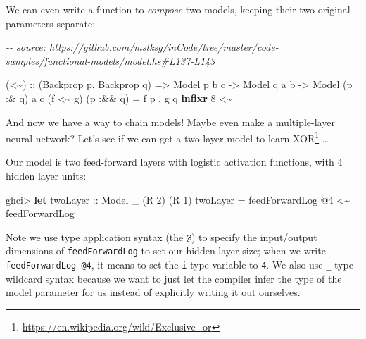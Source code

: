 \documentclass[]{article}
\newenvironment{Shaded}{}{}
\newcommand{\CommentTok}[1]{\textcolor[rgb]{0.38,0.63,0.69}{\textit{#1}}}
\newcommand{\DataTypeTok}[1]{\textcolor[rgb]{0.56,0.13,0.00}{#1}}
\newcommand{\DecValTok}[1]{\textcolor[rgb]{0.25,0.63,0.44}{#1}}
\newcommand{\KeywordTok}[1]{\textcolor[rgb]{0.00,0.44,0.13}{\textbf{#1}}}
\newcommand{\NormalTok}[1]{#1}
\newcommand{\OperatorTok}[1]{\textcolor[rgb]{0.40,0.40,0.40}{#1}}
\newcommand{\OtherTok}[1]{\textcolor[rgb]{0.00,0.44,0.13}{#1}}
\renewcommand{\href}[2]{#2\footnote{\url{#1}}}
\begin{document}
We can even write a function to \emph{compose} two models, keeping their two
original parameters separate:

\begin{Shaded}
\begin{Highlighting}[]
\CommentTok{{-}{-} source: https://github.com/mstksg/inCode/tree/master/code{-}samples/functional{-}models/model.hs\#L137{-}L143}

\NormalTok{(}\OperatorTok{\textless{}\textasciitilde{}}\NormalTok{)}
\OtherTok{    ::}\NormalTok{ (}\DataTypeTok{Backprop}\NormalTok{ p, }\DataTypeTok{Backprop}\NormalTok{ q)}
    \OtherTok{=\textgreater{}} \DataTypeTok{Model}\NormalTok{  p       b c}
    \OtherTok{{-}\textgreater{}} \DataTypeTok{Model}\NormalTok{       q  a b}
    \OtherTok{{-}\textgreater{}} \DataTypeTok{Model}\NormalTok{ (p }\OperatorTok{:\&}\NormalTok{ q) a c}
\NormalTok{(f }\OperatorTok{\textless{}\textasciitilde{}}\NormalTok{ g) (p }\OperatorTok{:\&\&}\NormalTok{ q) }\OtherTok{=}\NormalTok{ f p }\OperatorTok{.}\NormalTok{ g q}
\KeywordTok{infixr} \DecValTok{8} \OperatorTok{\textless{}\textasciitilde{}}
\end{Highlighting}
\end{Shaded}

And now we have a way to chain models! Maybe even make a multiple-layer neural
network? Let's see if we can get a two-layer model to learn
\href{https://en.wikipedia.org/wiki/Exclusive_or}{XOR} \ldots{}

Our model is two feed-forward layers with logistic activation functions, with 4
hidden layer units:

\begin{Shaded}
\begin{Highlighting}[]
\NormalTok{ghci}\OperatorTok{\textgreater{}} \KeywordTok{let}\OtherTok{ twoLayer ::} \DataTypeTok{Model}\NormalTok{ \_ (}\DataTypeTok{R} \DecValTok{2}\NormalTok{) (}\DataTypeTok{R} \DecValTok{1}\NormalTok{)}
\NormalTok{          twoLayer }\OtherTok{=}\NormalTok{ feedForwardLog\textquotesingle{} }\OperatorTok{@}\DecValTok{4} \OperatorTok{\textless{}\textasciitilde{}}\NormalTok{ feedForwardLog\textquotesingle{}}
\end{Highlighting}
\end{Shaded}

Note we use type application syntax (the \texttt{@}) to specify the input/output
dimensions of \texttt{feedForwardLog\textquotesingle{}} to set our hidden layer
size; when we write \texttt{feedForwardLog\textquotesingle{}\ @4}, it means to
set the \texttt{i} type variable to \texttt{4}. We also use \texttt{\_} type
wildcard syntax because we want to just let the compiler infer the type of the
model parameter for us instead of explicitly writing it out ourselves.
\end{document}
